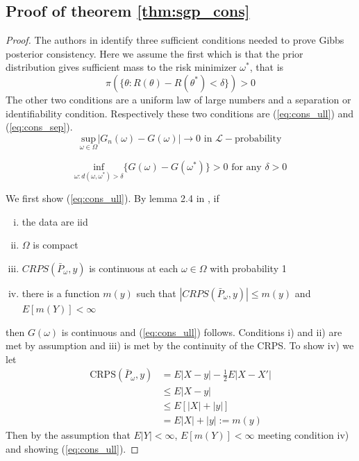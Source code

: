 \subsection{Proof of theorem \ref{thm:sgp_cons}} \label{app:sgp_cons_pf}
\begin{proof}
The authors in
\cite{martin2022direct} identify three sufficient conditions needed to prove 
Gibbs posterior consistency. 
Here we assume the first which is that the prior distribution gives 
sufficient mass to the risk minimizer $\omega^*$, that is 
\begin{equation}
  \pi(\{\theta:R(\theta) - R(\theta^*) < \delta \}) > 0
\end{equation}
The other two conditions are a uniform law of large numbers 
and a separation or identifiability condition. Respectively these two 
conditions are (\ref{eq:cons_ull}) and (\ref{eq:cons_sep}).
\begin{equation}
    \underset{\omega \in \Omega}{\text{sup}} |G_n(\omega) - G(\omega)| 
    \rightarrow 0 \text{ in } \mathcal{L}-\text{probability}
    \label{eq:cons_ull}
\end{equation}

\begin{equation}
    \underset{\omega:d(\omega, \omega^*) > \delta}{\text{inf}} \{G(\omega) - 
    G(\omega^*)\} > 0 \text{ for any } \delta > 0
    \label{eq:cons_sep}
\end{equation}

\noindent We first show (\ref{eq:cons_ull}). By lemma 2.4 in 
\cite{newey1994large}, if 
\begin{enumerate}[i)]%
    \item the data are iid
    \item $\Omega$ is compact
    \item $CRPS(\bar{P}_{\omega}, y)$ is continuous at each $\omega \in 
    \Omega$ with probability 1
    \item there is a function $m(y)$ such that $|CRPS(\bar{P}_{\omega}, y)| 
    \leq m(y)$ and $E[m(Y)] < \infty$
\end{enumerate}
then $G(\omega)$ is continuous and (\ref{eq:cons_ull}) follows. Conditions i) 
and ii) are met by assumption and iii) is met by the continuity of the CRPS.
To show iv) we let
\begin{align*}
    \text{CRPS}(\bar{P}_{\omega}, y) &= E|X - y| - \frac{1}{2}E|X - X'| \\
    &\leq E|X - y| \\
    &\leq E\left[|X| + |y|\right] \\
    &=E|X| + |y| := m(y)
\end{align*}
Then by the assumption that $E|Y| < \infty$, $E[m(Y)] < \infty$ meeting 
condition iv) and showing (\ref{eq:cons_ull}).


\end{proof}
